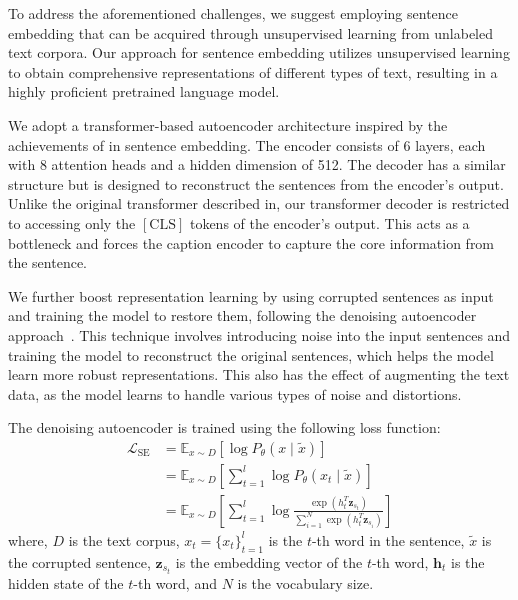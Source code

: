 To address the aforementioned challenges, we suggest employing sentence embedding that can be acquired through unsupervised learning from unlabeled text corpora.
Our approach for sentence embedding utilizes unsupervised learning to obtain comprehensive representations of different types of text, resulting in a highly proficient pretrained language model.

We adopt a transformer-based autoencoder architecture inspired by the achievements of \cite{Wang2022-um} in sentence embedding.
The encoder consists of 6 layers, each with 8 attention heads and a hidden dimension of 512.
The decoder has a similar structure but is designed to reconstruct the sentences from the encoder's output.
Unlike the original transformer described in\cite{Vaswani2017-sc}, our transformer decoder is restricted to accessing only the $[\mathrm{CLS}]$ tokens of the encoder's output.
This acts as a bottleneck and forces the caption encoder to capture the core information from the sentence.

We further boost representation learning by using corrupted sentences as input and training the model to restore them, following the denoising autoencoder approach~\cite{Vincent2010-yp,Hill2016-sk}.
This technique involves introducing noise into the input sentences and training the model to reconstruct the original sentences, which helps the model learn more robust representations.
This also has the effect of augmenting the text data, as the model learns to handle various types of noise and distortions.

The denoising autoencoder is trained using the following loss function:
\begin{equation}
\begin{aligned}
    \mathcal{L}_{\text{SE}} & =\mathbb{E}_{x \sim D}\left[\log P_\theta(x \mid \tilde{x})\right] \\
    & =\mathbb{E}_{x \sim D}\left[\sum_{t=1}^l \log P_\theta\left(x_t \mid \tilde{x}\right)\right] \\
    & =\mathbb{E}_{x \sim D}\left[\sum_{t=1}^l \log \frac{\exp \left(h_t^T \bm{z}_{s_t}\right)}{\sum_{i=1}^N \exp \left(h_t^T \bm{z}_{s_i}\right)}\right]
\end{aligned}
\end{equation}
where, $D$ is the text corpus, $x_t=\{ x_t \}_{t=1}^{l}$ is the $t$-th word in the sentence, $\tilde{x}$ is the corrupted sentence, $\bm{z}_{s_t}$ is the embedding vector of the $t$-th word, $\bm{h}_t$ is the hidden state of the $t$-th word, and $N$ is the vocabulary size.


